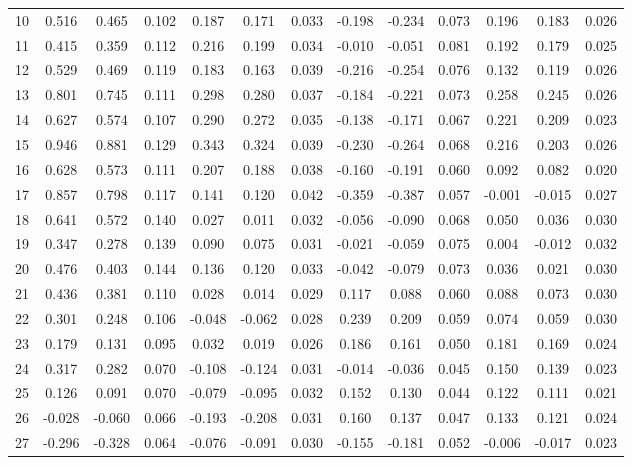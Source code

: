{\begin{footnotesize}
\begin{longtable}{lcccccccccccc}
10 & 0.516 & 0.465 & 0.102 & 0.187 & 0.171 & 0.033 & -0.198 & -0.234 & 0.073 & 0.196 & 0.183 & 0.026 \\
11 & 0.415 & 0.359 & 0.112 & 0.216 & 0.199 & 0.034 & -0.010 & -0.051 & 0.081 & 0.192 & 0.179 & 0.025 \\
12 & 0.529 & 0.469 & 0.119 & 0.183 & 0.163 & 0.039 & -0.216 & -0.254 & 0.076 & 0.132 & 0.119 & 0.026 \\
13 & 0.801 & 0.745 & 0.111 & 0.298 & 0.280 & 0.037 & -0.184 & -0.221 & 0.073 & 0.258 & 0.245 & 0.026 \\
14 & 0.627 & 0.574 & 0.107 & 0.290 & 0.272 & 0.035 & -0.138 & -0.171 & 0.067 & 0.221 & 0.209 & 0.023 \\
15 & 0.946 & 0.881 & 0.129 & 0.343 & 0.324 & 0.039 & -0.230 & -0.264 & 0.068 & 0.216 & 0.203 & 0.026 \\
16 & 0.628 & 0.573 & 0.111 & 0.207 & 0.188 & 0.038 & -0.160 & -0.191 & 0.060 & 0.092 & 0.082 & 0.020 \\
17 & 0.857 & 0.798 & 0.117 & 0.141 & 0.120 & 0.042 & -0.359 & -0.387 & 0.057 & -0.001 & -0.015 & 0.027 \\
18 & 0.641 & 0.572 & 0.140 & 0.027 & 0.011 & 0.032 & -0.056 & -0.090 & 0.068 & 0.050 & 0.036 & 0.030 \\
19 & 0.347 & 0.278 & 0.139 & 0.090 & 0.075 & 0.031 & -0.021 & -0.059 & 0.075 & 0.004 & -0.012 & 0.032 \\
20 & 0.476 & 0.403 & 0.144 & 0.136 & 0.120 & 0.033 & -0.042 & -0.079 & 0.073 & 0.036 & 0.021 & 0.030 \\
21 & 0.436 & 0.381 & 0.110 & 0.028 & 0.014 & 0.029 & 0.117 & 0.088 & 0.060 & 0.088 & 0.073 & 0.030 \\
22 & 0.301 & 0.248 & 0.106 & -0.048 & -0.062 & 0.028 & 0.239 & 0.209 & 0.059 & 0.074 & 0.059 & 0.030 \\
23 & 0.179 & 0.131 & 0.095 & 0.032 & 0.019 & 0.026 & 0.186 & 0.161 & 0.050 & 0.181 & 0.169 & 0.024 \\
24 & 0.317 & 0.282 & 0.070 & -0.108 & -0.124 & 0.031 & -0.014 & -0.036 & 0.045 & 0.150 & 0.139 & 0.023 \\
25 & 0.126 & 0.091 & 0.070 & -0.079 & -0.095 & 0.032 & 0.152 & 0.130 & 0.044 & 0.122 & 0.111 & 0.021 \\
26 & -0.028 & -0.060 & 0.066 & -0.193 & -0.208 & 0.031 & 0.160 & 0.137 & 0.047 & 0.133 & 0.121 & 0.024 \\
27 & -0.296 & -0.328 & 0.064 & -0.076 & -0.091 & 0.030 & -0.155 & -0.181 & 0.052 & -0.006 & -0.017 & 0.023 \\

\end{longtable}
\end{footnotesize}}
